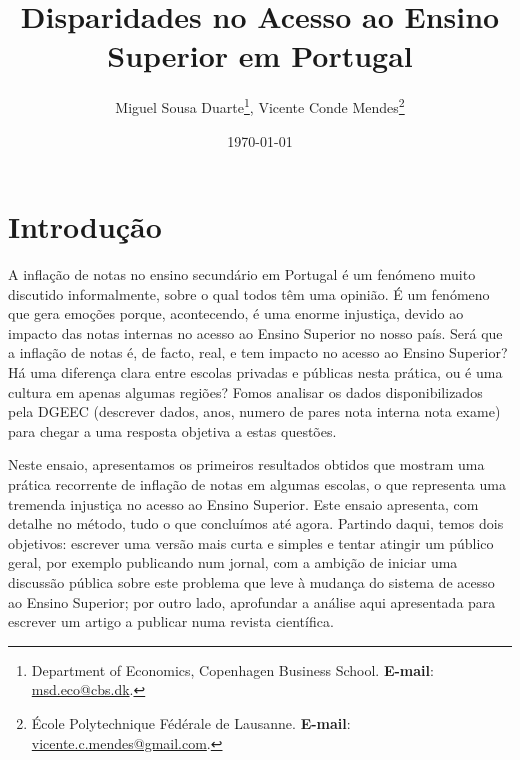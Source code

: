 \documentclass{article}
\begin{document}
\title{Disparidades no Acesso ao Ensino Superior em Portugal}
\author{Miguel Sousa Duarte\thanks{{\tiny{}Department of Economics, Copenhagen Business School. \textbf{E-mail}: \url{msd.eco@cbs.dk}.}},
Vicente Conde Mendes\thanks{{\tiny{}École Polytechnique Fédérale de Lausanne. \textbf{E-mail}: \url{vicente.c.mendes@gmail.com}.}}\\}

\date{\today}

\setlength{\parskip}{1em}
\maketitle

\section{Introdução}


A inflação de notas no ensino secundário em Portugal é um fenómeno muito discutido informalmente, sobre o qual todos têm uma opinião. É um fenómeno que gera emoções porque, acontecendo, é uma enorme injustiça, devido ao impacto das notas internas no acesso ao Ensino Superior no nosso país. Será que a inflação de notas é, de facto, real, e tem impacto no acesso ao Ensino Superior? Há uma diferença clara entre escolas privadas e públicas nesta prática, ou é uma cultura em apenas algumas regiões? Fomos analisar os dados disponibilizados pela DGEEC (descrever dados, anos, numero de pares nota interna nota exame) para chegar a uma resposta objetiva a estas questões.

Neste ensaio, apresentamos os primeiros resultados obtidos que mostram uma prática recorrente de inflação de notas em algumas escolas, o que representa uma tremenda injustiça no acesso ao Ensino Superior. Este ensaio apresenta, com detalhe no método, tudo o que concluímos até agora. Partindo daqui, temos dois objetivos: escrever uma versão mais curta e simples e tentar atingir um público geral, por exemplo publicando num jornal, com a ambição de iniciar uma discussão pública sobre este problema que leve à mudança do sistema de acesso ao Ensino Superior; por outro lado, aprofundar a análise aqui apresentada para escrever um artigo a publicar numa revista científica.
\end{document}
